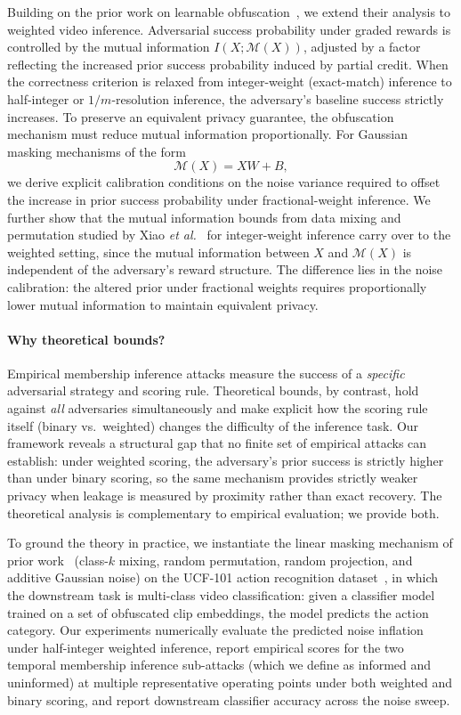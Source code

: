 \documentclass[letterpaper]{article} %
\begin{document}
Building on the prior work on learnable obfuscation~\cite{xiao2024formal}, we extend their analysis to weighted video inference. Adversarial success probability under graded rewards is controlled by the mutual information $I(X; \mathcal{M}(X))$, adjusted by a factor reflecting the increased prior success probability induced by partial credit. When the correctness criterion is relaxed from integer-weight (exact-match) inference to half-integer or $1/m$-resolution inference, the adversary's baseline success strictly increases. To preserve an equivalent privacy guarantee, the obfuscation mechanism must reduce mutual information proportionally. For Gaussian masking mechanisms of the form
\[
\mathcal{M}(X) = XW + B,
\]
we derive explicit calibration conditions on the noise variance required to offset the increase in prior success probability under fractional-weight inference. We further show that the mutual information bounds from data mixing and permutation studied by Xiao \textit{et al.}~\cite{xiao2024formal} for integer-weight inference carry over to the weighted setting, since the mutual information between $X$ and $\mathcal{M}(X)$ is independent of the adversary's reward structure. The difference lies in the noise calibration: the altered prior under fractional weights requires proportionally lower mutual information to maintain equivalent privacy.

\paragraph{Why theoretical bounds?}
Empirical membership inference attacks measure the success of a \emph{specific} adversarial strategy and scoring rule. Theoretical bounds, by contrast, hold against \emph{all} adversaries simultaneously and make explicit how the scoring rule itself (binary vs.\ weighted) changes the difficulty of the inference task. Our framework reveals a structural gap that no finite set of empirical attacks can establish: under weighted scoring, the adversary's prior success is strictly higher than under binary scoring, so the same mechanism provides strictly weaker privacy when leakage is measured by proximity rather than exact recovery. The theoretical analysis is complementary to empirical evaluation; we provide both.

To ground the theory in practice, we instantiate the linear masking mechanism of prior work~\cite{xiao2024formal} (class-$k$ mixing, random permutation, random projection, and additive Gaussian noise) on the UCF-101 action recognition dataset~\cite{soomro2012ucf101}, in which the downstream task is multi-class video classification: given a classifier model trained on a set of obfuscated clip embeddings, the model predicts the action category. Our experiments numerically evaluate the predicted noise inflation under half-integer weighted inference, report empirical scores for the two temporal membership inference sub-attacks (which we define as informed and uninformed) at multiple representative operating points under both weighted and binary scoring, and report downstream classifier accuracy across the noise sweep.
\end{document}
